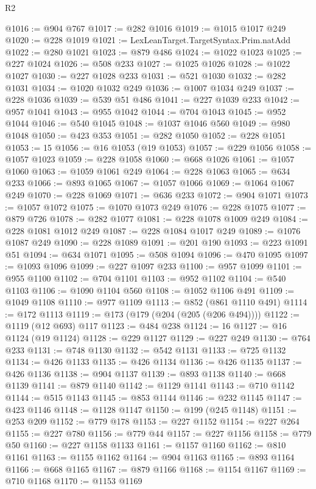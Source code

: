 \begin{lexlean}{R2}
\begin{coremodule}
@1016 := @904 @767
@1017 := @282 @1016
@1019 := @1015 @1017 @249
@1020 := @228 @1019
@1021 := LexLeanTarget.TargetSyntax.Prim.natAdd
@1022 := @280 @1021
@1023 := @879 @486
@1024 := @1022 @1023
@1025 := @227 @1024
@1026 := @508 @233
@1027 := @1025 @1026
@1028 := @1022 @1027
@1030 := @227 @1028 @233
@1031 := @521 @1030
@1032 := @282 @1031
@1034 := @1020 @1032 @249
@1036 := @1007 @1034 @249
@1037 := @228 @1036
@1039 := @539 @51 @486
@1041 := @227 @1039 @233
@1042 := @957 @1041
@1043 := @955 @1042
@1044 := @704 @1043
@1045 := @952 @1044
@1046 := @540 @1045
@1048 := @1037 @1046 @560
@1049 := @980 @1048
@1050 := @423 @353
@1051 := @282 @1050
@1052 := @228 @1051
@1053 := 15
@1056 := @16 @1053 (@19 @1053)
@1057 := @229 @1056
@1058 := @1057 @1023
@1059 := @228 @1058
@1060 := @668 @1026
@1061 := @1057 @1060
@1063 := @1059 @1061 @249
@1064 := @228 @1063
@1065 := @634 @233
@1066 := @893 @1065
@1067 := @1057 @1066
@1069 := @1064 @1067 @249
@1070 := @228 @1069
@1071 := @636 @233
@1072 := @904 @1071
@1073 := @1057 @1072
@1075 := @1070 @1073 @249
@1076 := @228 @1075
@1077 := @879 @726
@1078 := @282 @1077
@1081 := @228 @1078 @1009 @249
@1084 := @228 @1081 @1012 @249
@1087 := @228 @1084 @1017 @249
@1089 := @1076 @1087 @249
@1090 := @228 @1089
@1091 := @201 @190
@1093 := @223 @1091 @51
@1094 := @634 @1071
@1095 := @508 @1094
@1096 := @470 @1095
@1097 := @1093 @1096
@1099 := @227 @1097 @233
@1100 := @957 @1099
@1101 := @955 @1100
@1102 := @704 @1101
@1103 := @952 @1102
@1104 := @540 @1103
@1106 := @1090 @1104 @560
@1108 := @1052 @1106 @491
@1109 := @1049 @1108
@1110 := @977 @1109
@1113 := @852 (@861 @1110 @491)
@1114 := @172 @1113
@1119 := @173 (@179 (@204 (@205 (@206 @494))))
@1122 := @1119 (@12 @693) @117
@1123 := @484 @238
@1124 := 16
@1127 := @16 @1124 (@19 @1124)
@1128 := @229 @1127
@1129 := @227 @249
@1130 := @764 @233
@1131 := @748 @1130
@1132 := @542 @1131
@1133 := @725 @1132
@1134 := @426 @1133
@1135 := @426 @1134
@1136 := @426 @1135
@1137 := @426 @1136
@1138 := @904 @1137
@1139 := @893 @1138
@1140 := @668 @1139
@1141 := @879 @1140
@1142 := @1129 @1141
@1143 := @710 @1142
@1144 := @515 @1143
@1145 := @853 @1144
@1146 := @232 @1145
@1147 := @423 @1146
@1148 := @1128 @1147
@1150 := @199 (@245 @1148)
@1151 := @253 @209
@1152 := @779 @178
@1153 := @227 @1152
@1154 := @227 @264
@1155 := @227 @780
@1156 := @779 @44
@1157 := @227 @1156
@1158 := @779 @50
@1160 := @227 @1158 @1133
@1161 := @1157 @1160
@1162 := @810 @1161
@1163 := @1155 @1162
@1164 := @904 @1163
@1165 := @893 @1164
@1166 := @668 @1165
@1167 := @879 @1166
@1168 := @1154 @1167
@1169 := @710 @1168
@1170 := @1153 @1169

\end{coremodule}
\end{lexlean}
